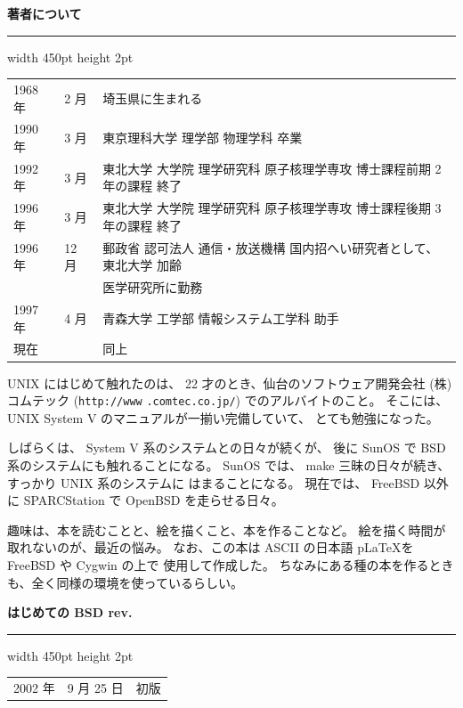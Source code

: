 \thispagestyle{empty}

\noindent
\textbf{\Large 著者について}

\vspace*{3mm}

\hrule width 450pt height 2pt

\noindent
\begin{tabular}{lll}
1968 年 & 2 月 & 埼玉県に生まれる\\
1990 年 & 3 月 & 東京理科大学 理学部 物理学科 卒業\\
1992 年 & 3 月 & 東北大学 大学院 理学研究科 原子核理学専攻 博士課程前期 2 年の課程 終了\\
1996 年 & 3 月 & 東北大学 大学院 理学研究科 原子核理学専攻 博士課程後期 3 年の課程 終了\\
1996 年 & 12 月 & 郵政省 認可法人 通信・放送機構 国内招へい研究者として、
東北大学 加齢\\
& & 医学研究所に勤務\\
1997 年 & 4 月 & 青森大学 工学部 情報システム工学科 助手\\
現在 & & 同上
\end{tabular}

\setlength{\baselineskip}{6mm}
\vspace*{0.5cm}

UNIX にはじめて触れたのは、 22 才のとき、仙台のソフトウェア開発会社
(株)コムテック
(\texttt{http://www}
\texttt{.comtec.co.jp/})
でのアルバイトのこと。
そこには、 UNIX System V のマニュアルが一揃い完備していて、
とても勉強になった。

しばらくは、 System V 系のシステムとの日々が続くが、
後に SunOS で BSD 系のシステムにも触れることになる。
 SunOS では、 make 三昧の日々が続き、すっかり UNIX 系のシステムに
はまることになる。
現在では、 FreeBSD 以外に SPARCStation で OpenBSD を走らせる日々。

趣味は、本を読むことと、絵を描くこと、本を作ることなど。
絵を描く時間が取れないのが、最近の悩み。
なお、この本は ASCII の日本語 p\LaTeX を FreeBSD や Cygwin の上で
使用して作成した。
ちなみにある種の本を作るときも、全く同様の環境を使っているらしい。

\vspace*{1.2cm}

\noindent
\textbf{\Large はじめての BSD rev.}

\vspace*{3mm}

\hrule width 450pt height 2pt

\noindent
\begin{tabular}{lll}
2002 年 & 9 月 25 日 & 初版
\end{tabular}

